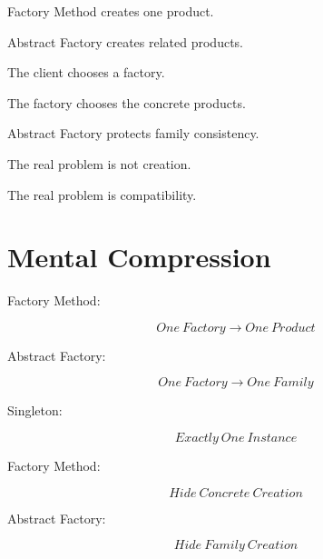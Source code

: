 \documentclass[11pt,a4paper]{book}
\begin{document}
\begin{rosettarule}

Factory Method creates one product.

Abstract Factory creates related products.

\end{rosettarule}

\begin{rosettarule}

The client chooses a factory.

The factory chooses the concrete products.

\end{rosettarule}

\begin{rosettarule}

Abstract Factory protects family consistency.

\end{rosettarule}

\begin{rosettarule}

The real problem is not creation.

The real problem is compatibility.

\end{rosettarule}


\section{Mental Compression}

\begin{compressionbox}

Factory Method:

\[
One\ Factory
\rightarrow
One\ Product
\]

Abstract Factory:

\[
One\ Factory
\rightarrow
One\ Family
\]

Singleton:

\[
Exactly\ One\ Instance
\]

Factory Method:

\[
Hide\ Concrete\ Creation
\]

Abstract Factory:

\[
Hide\ Family\ Creation
\]

\end{compressionbox}
\end{document}
